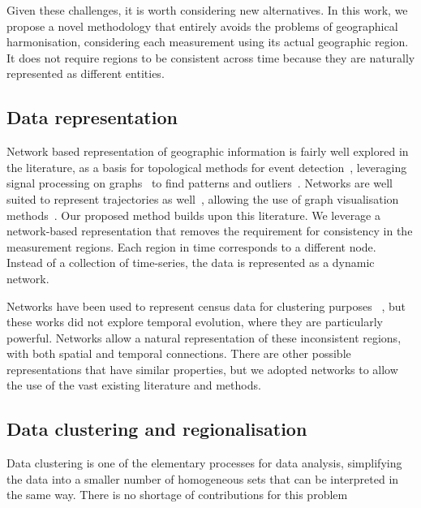 Given these challenges, it is worth considering new alternatives. In this work,
we propose a novel methodology that entirely avoids the problems of geographical
harmonisation, considering each measurement using its actual geographic region.
It does not require regions to be consistent across time because they are
naturally represented as different entities. 

\subsection{Data representation}

Network based representation of geographic information is fairly well explored
in the literature, as a basis for topological methods for event
detection~\citep{Doraiswamy2014}, leveraging signal processing on
graphs~\citep{shuman2013emerging,sandryhaila2013discrete} to find patterns and
outliers~\citep{Valdivia2015,Dias2015,Alce2018}. Networks are well suited to
represent trajectories as
well~\citep{VonLandesberger2016,Huang2016,chen2015survey}, allowing the use of
graph visualisation methods~\citep{Vehlow2015,Beck2014}. Our proposed method
builds upon this literature. We leverage a network-based representation that
removes the requirement for consistency in the measurement regions. Each region
in time corresponds to a different node. Instead of a collection of time-series,
the data is represented as a dynamic network. 

Networks have been used to represent census data for clustering purposes
~\citep{Dias2015,Setiadi2017}, but these works did not explore temporal
evolution, where they are particularly powerful. Networks allow a natural
representation of these inconsistent regions, with both spatial and temporal
connections. There are other possible representations that have similar
properties, but we adopted networks to allow the use of the vast existing
literature and methods.


\subsection{Data clustering and regionalisation}

Data clustering is one of the elementary processes for data analysis,
simplifying the data into a smaller number of homogeneous sets that can be
interpreted in the same way. There is no shortage of contributions for this
problem~\citep{Fahad2014}


